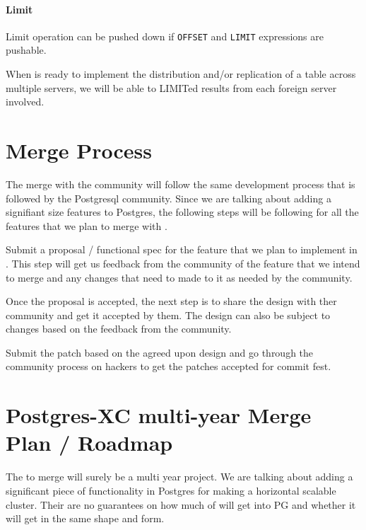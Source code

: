 \paragraph{Limit}

	Limit operation can be pushed down if \texttt{OFFSET} and \texttt{LIMIT} expressions
	are pushable.

	When \PG{} is ready to implement the distribution and/or replication of a table across
	multiple servers, we will be able to LIMITed results from each foreign server involved.




\section{Merge Process}

	The \XC{} merge with the community will follow the same development process that is
	followed by the Postgresql community.
	Since we are talking about adding a signifiant size features to Postgres, the following
	steps will be following for all the features that we plan to merge with \PG.

	Submit a proposal / functional spec for the feature that we plan to implement in \PG.
	This step will get us feedback from the community of the feature that we intend to merge
	and any changes that need to made to it as needed by the community.

	Once the proposal is accepted, the next step is to share the design with ther community
	and get it accepted by them.
	The design can also be subject to changes based on the feedback from the community.

	Submit the patch based on the agreed upon design and go through the community process
	on hackers to get the patches accepted for commit fest.



\section{Postgres-XC multi-year Merge Plan / Roadmap}

	The \XC{} to \PG{} merge will surely be a multi year project.
	We are talking about adding a significant piece of functionality in Postgres
	for making \PG{} a horizontal scalable cluster.
	Their are no guarantees on how much of \XC{} will get into PG and whether
	it will get in the same shape and form.

